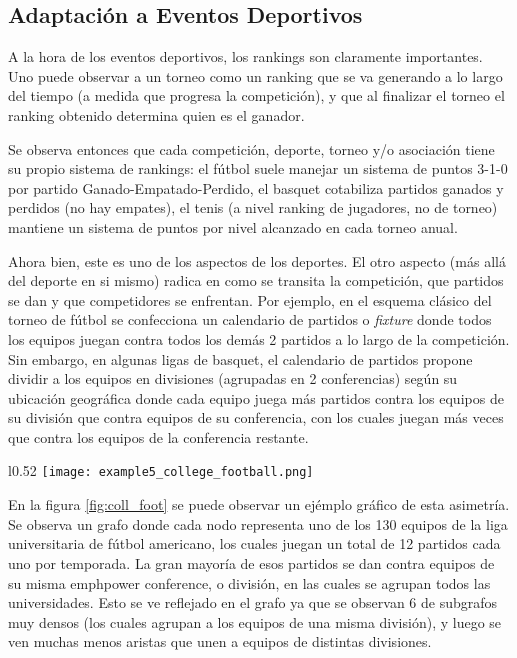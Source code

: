 \subsection{Adaptaci\'on a Eventos Deportivos}
\par A la hora de los eventos deportivos, los rankings son claramente
importantes. Uno puede observar a un torneo como un ranking que se va generando
a lo largo del tiempo (a medida que progresa la competici\'on), y que al
finalizar el torneo el ranking obtenido determina quien es el ganador.

\par Se observa entonces que cada competici\'on, deporte, torneo y/o
asociaci\'on tiene su propio sistema de rankings: el f\'utbol suele manejar un
sistema de puntos 3-1-0 por partido Ganado-Empatado-Perdido, el basquet
cotabiliza partidos ganados y perdidos (no hay empates), el tenis (a nivel
ranking de jugadores, no de torneo) mantiene un sistema de puntos por nivel
alcanzado en cada torneo anual.

\par Ahora bien, este es uno de los aspectos de los deportes. El otro aspecto
(m\'as all\'a del deporte en si mismo) radica en como se transita la
competici\'on, que partidos se dan y que competidores se enfrentan. Por ejemplo,
en el esquema cl\'asico del torneo de f\'utbol se confecciona un calendario de
partidos o \emph{fixture} donde todos los equipos juegan contra todos los
dem\'as 2 partidos a lo largo de la competici\'on. Sin embargo, en algunas ligas
de basquet, el calendario de partidos propone dividir a los equipos en
divisiones (agrupadas en 2 conferencias) seg\'un su ubicaci\'on geogr\'afica
donde cada equipo juega m\'as partidos contra los equipos de su divisi\'on que
contra equipos de su conferencia, con los cuales juegan m\'as veces que contra
los equipos de la conferencia restante.

\begin{wrapfigure}[22]{l}{0.52\textwidth}
    \centering
    \texttt{[image: example5\_college\_football.png]}
    \caption{Grafo de Encuentros de la liga de f\'utbol americano
        universitaria~\cite{college_football_graph}}
    \label{fig:coll_foot}
\end{wrapfigure}

\par En la figura \ref{fig:coll_foot} se puede observar un ej\'emplo gr\'afico
de esta asimetr\'ia. Se observa un grafo donde cada nodo representa uno de los
130 equipos de la liga universitaria de f\'utbol americano, los cuales juegan un
total de 12 partidos cada uno por temporada. La gran mayor\'ia de esos partidos
se dan contra equipos de su misma emph{power conference}, o divisi\'on, en las
cuales se agrupan todos las universidades. Esto se ve reflejado en el grafo ya
que se observan 6 de subgrafos muy densos (los cuales agrupan a los equipos de
una misma divisi\'on), y luego se ven muchas menos aristas que unen a equipos de
distintas divisiones.

